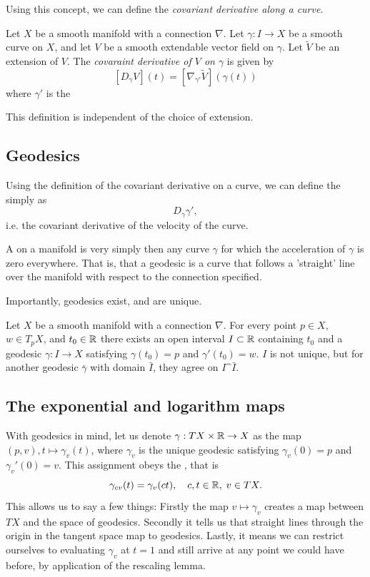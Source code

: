 Using this concept, we can define the \emph{covariant derivative along a curve}.
\begin{definition}
	Let \(X\) be a smooth manifold with a connection \(\nabla\).
	Let \(\gamma: I \to X\) be a smooth curve on \(X\), and let \(V\) be a smooth extendable vector field on \(\gamma\).
	Let \(\tilde V\) be an extension of \(V\).
	The \emph{covaraint derivative of \(V\) on \(\gamma\)} is given by
	\[
		[D_\gamma V](t) = [\nabla_{\gamma'} \tilde V](\gamma(t))
	\]
	where \(\gamma'\) is the 
\end{definition}
This definition is independent of the choice of extension.

\subsection{Geodesics}

Using the definition of the covariant derivative on a curve, we can define the  simply as
\[D_\gamma \gamma',\] i.e. the covariant derivative of the velocity of the curve.

A  on a manifold is very simply then any curve \(\gamma\) for which the acceleration of \(\gamma\) is zero everywhere.
That is, that a geodesic is a curve that follows a 'straight' line over the manifold with respect to the connection specified.

Importantly, geodesics exist, and are unique.
\begin{theorem}
	Let \(X\) be a smooth manifold with a connection \(\nabla\).
	For every point \(p\in X\), \(w\in T_pX\), and \(t_0\in\mathbb{R}\) there exists an open interval \(I\subset \mathbb{R}\) containing \(t_0\) and a geodesic \(\gamma: I\to X\) satisfying \(\gamma(t_0) = p\) and \(\gamma'(t_0) = w\).
	\(I\) is not unique, but for another geodesic \(\bar\gamma\) with domain \(\bar I\), they agree on \(I\^\bar I\).
\end{theorem}

\subsection{The exponential and logarithm maps}

With geodesics in mind, let us denote \(\gamma: TX \times \mathbb{R} \to X\) as the map \((p, v), t \mapsto \gamma_v(t)\), where \(\gamma_v\) is the unique geodesic satisfying \(\gamma_v(0) = p\) and \(\gamma_v'(0) = v\). This assignment obeys the , that is
\[\gamma_{cv}(t) = \gamma_v(ct), \quad c,t\in \mathbb{R}, \; v \in TX.\]
This allows us to say a few things: 
Firstly the map \(v\mapsto \gamma_v\) creates a map between \(TX\) and the space of geodesics.
Secondly it tells us that straight lines through the origin in the tangent space map to geodesics.
Lastly, it means we can restrict ourselves to evaluating \(\gamma_v\) at \(t=1\) and still arrive at any point we could have before, by application of the rescaling lemma.


